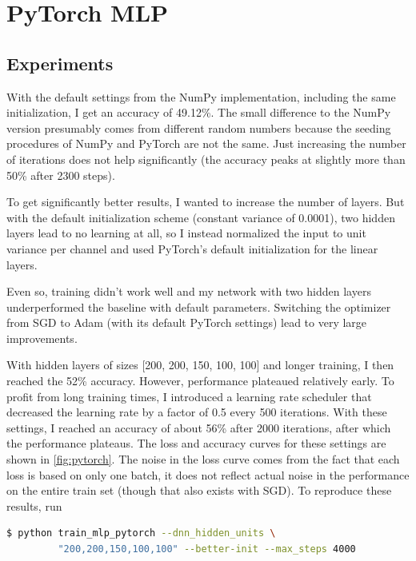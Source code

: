 \documentclass{article}
\begin{document}
\section{PyTorch MLP}
\subsection{Experiments}
With the default settings from the NumPy implementation, including the same initialization,
I get an accuracy of 49.12\%. The small difference to the NumPy version presumably comes
from different random numbers because the seeding procedures of NumPy and PyTorch are
not the same. Just increasing the number of iterations does not help significantly (the accuracy
peaks at slightly more than 50\% after 2300 steps).

To get significantly better results, I wanted to increase the number of layers. But with the default
initialization scheme (constant variance of 0.0001), two hidden layers lead to no learning at all, so I instead
normalized the input to unit variance per channel and used PyTorch's default initialization
for the linear layers.

Even so, training didn't work well and my network with two hidden layers underperformed
the baseline with default parameters. Switching the optimizer from SGD to Adam (with its default
PyTorch settings) lead to very large improvements.

With hidden layers of sizes [200, 200, 150, 100, 100] and longer training, I then reached the 52\%
accuracy. However, performance plateaued relatively early. To profit from long training times,
I introduced a learning rate scheduler that decreased the learning rate by a factor of 0.5 every 500
iterations. With these settings, I reached an accuracy of about 56\% after 2000 iterations, after which
the performance plateaus. The loss and accuracy curves for these settings are shown in
\cref{fig:pytorch}. The noise in the loss curve comes from the fact that each loss is based on only
one batch, it does not reflect actual noise in the performance on the entire train set (though that
also exists with SGD). To reproduce these results, run\\
\begin{lstlisting}[language=bash]
  $ python train_mlp_pytorch --dnn_hidden_units \
         "200,200,150,100,100" --better-init --max_steps 4000
\end{lstlisting}
\end{document}
